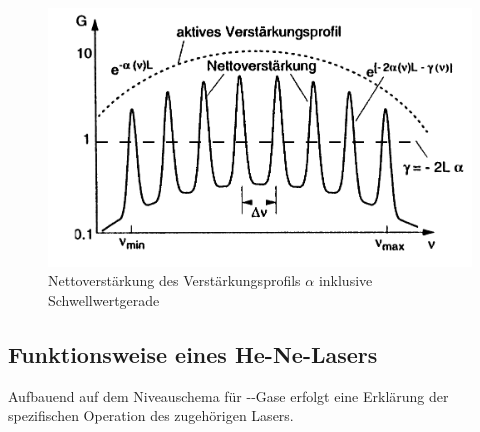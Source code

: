 \begin{figure}[H]
    \centering
    \includegraphics[scale=0.4]{Ressourcen/netto.png}
    \caption{Nettoverstärkung des Verstärkungsprofils $\alpha$ inklusive Schwellwertgerade\cite{Demtroeder}}\label{fig:netto}
\end{figure}
\subsection{Funktionsweise eines He-Ne-Lasers}
Aufbauend auf dem Niveauschema für --Gase erfolgt eine Erklärung der spezifischen Operation des zugehörigen Lasers.
